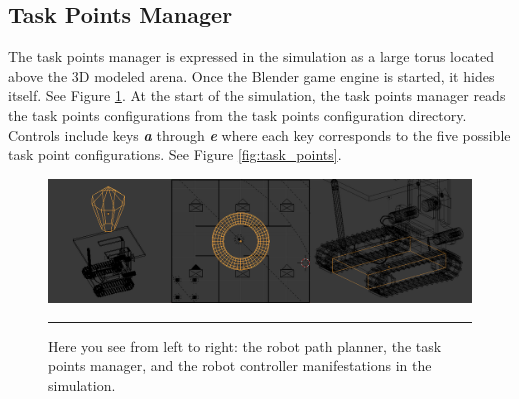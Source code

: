 
\subsection{Task Points Manager}


The task points manager is expressed in the simulation as a large torus located above the 3D modeled arena. Once the Blender game engine is started, it hides itself. See Figure \ref{fig:blendersim_components}. At the start of the simulation, the task points manager reads the task points configurations from the task points configuration directory. Controls include keys \textit{\textbf{a}} through \textit{\textbf{e}} where each key corresponds to the five possible task point configurations. See Figure \ref{fig:task_points}. 

\begin{figure}[htbp]
\centering
\includegraphics[scale=0.4]{../Figures/Chapter5/parts.png}
\rule{35em}{0.5pt}
\caption[BlenderSim Components]{Here you see from left to right: the robot path planner, the task points manager, and the robot controller manifestations in the simulation.}
\label{fig:blendersim_components}
\end{figure}

